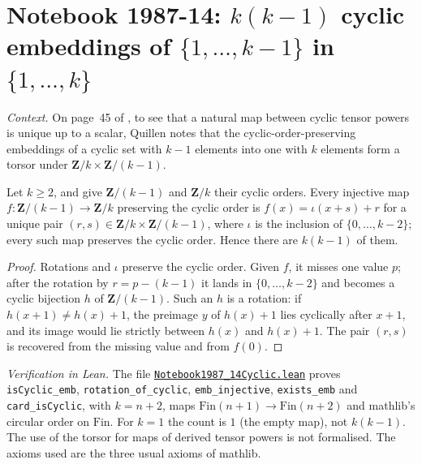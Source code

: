 \section[Notebook 1987-14: cyclic embeddings]{Notebook 1987-14: $k(k - 1)$ cyclic embeddings of $\{1, \dots, k - 1\}$ in $\{1, \dots, k\}$\protect{}}\label{sec:quillen-1987-14-cyclic}

\emph{Context.} On page~45 of , to see that a natural map between cyclic tensor powers is unique up to a scalar, Quillen notes that the cyclic-order-preserving embeddings of a cyclic set with $k - 1$ elements into one with $k$ elements form a torsor under $\mathbf Z/k \times \mathbf Z/(k - 1)$.

\begin{encadre}
\begin{theoreme}\label{thm:quillen-1987-14-cyclic}
Let $k \ge 2$, and give $\mathbf Z/(k-1)$ and $\mathbf Z/k$ their cyclic orders. Every injective map $f : \mathbf Z/(k-1) \to \mathbf Z/k$ preserving the cyclic order is $f(x) = \iota(x + s) + r$ for a unique pair $(r, s) \in \mathbf Z/k \times \mathbf Z/(k-1)$, where $\iota$ is the inclusion of $\{0, \dots, k-2\}$; every such map preserves the cyclic order. Hence there are $k(k - 1)$ of them.
\end{theoreme}
\end{encadre}

\begin{proof}
Rotations and $\iota$ preserve the cyclic order. Given $f$, it misses one value $p$; after the rotation by $r = p - (k - 1)$ it lands in $\{0, \dots, k - 2\}$ and becomes a cyclic bijection $h$ of $\mathbf Z/(k-1)$. Such an $h$ is a rotation: if $h(x + 1) \ne h(x) + 1$, the preimage $y$ of $h(x) + 1$ lies cyclically after $x + 1$, and its image would lie strictly between $h(x)$ and $h(x) + 1$. The pair $(r, s)$ is recovered from the missing value and from $f(0)$.
\end{proof}

\emph{Verification in Lean.} The file \href{\leanblobmain/Notebook1987_14Cyclic.lean}{\texttt{Notebook1987\_14Cyclic.\allowbreak{}lean}} proves \texttt{isCyclic\_emb}, \texttt{rotation\_of\_cyclic}, \texttt{emb\_injective}, \texttt{exists\_emb} and \texttt{card\_isCyclic}, with $k = n + 2$, maps $\mathrm{Fin}(n+1) \to \mathrm{Fin}(n+2)$ and mathlib's circular order on $\mathrm{Fin}$. For $k = 1$ the count is $1$ (the empty map), not $k(k-1)$. The use of the torsor for maps of derived tensor powers is not formalised. The axioms used are the three usual axioms of mathlib.

